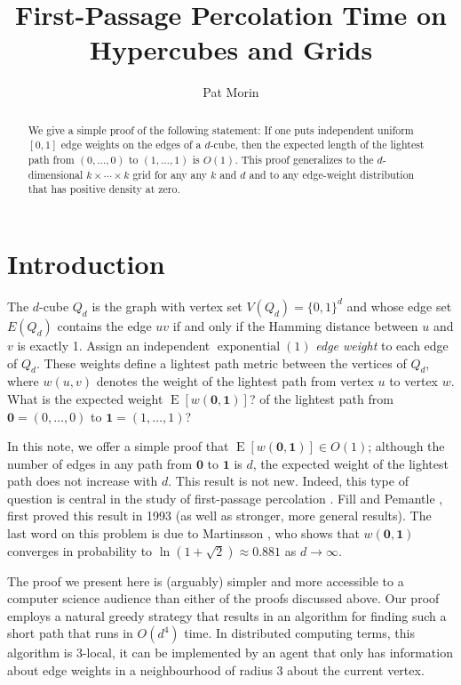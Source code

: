 \documentclass[a4paper,UKenglish]{lipics-v2016}
\title{First-Passage Percolation Time \newline on Hypercubes and Grids}
\author[1]{Pat Morin}
\affil[1]{Carleton University School of Computer Science, Ottawa, Canada \\
   \texttt{morin@scs.carleton.ca}a}
\DeclareMathOperator{\E}{E}
\DeclareMathOperator{\exponential}{exponential}
\begin{document}
\maketitle

\begin{abstract}
We give a simple proof of the following statement: If one puts independent
uniform $[0,1]$ edge weights on the edges of a $d$-cube, then the expected
length of the lightest path from $(0,\ldots,0)$ to $(1,\ldots,1)$ is
$O(1)$. This proof generalizes to the $d$-dimensional $k\times\cdots\times
k$ grid for any any $k$ and $d$ and to any edge-weight distribution that
has positive density at zero.
\end{abstract}

\section{Introduction}

The $d$-cube $Q_d$ is the graph with vertex set $V(Q_d)=\{0,1\}^d$
and whose edge set $E(Q_d)$ contains the edge $uv$ if and only if the
Hamming distance between $u$ and $v$ is exactly 1.
Assign an independent $\exponential(1)$ \emph{edge weight} to each
edge of $Q_d$.  These weights define a lightest path metric between the
vertices of $Q_d$, where $w(u,v)$ denotes the weight of the lightest
path from vertex $u$ to vertex $w$.  What is the expected weight
$\E[w(\mathbf{0},\mathbf{1})]$? of the lightest path from
$\mathbf{0}=(0,\ldots,0)$ to $\mathbf{1}=(1,\ldots,1)$?

In this note, we offer a simple proof that $\E[w(\mathbf{0},\mathbf{1})]
\in O(1)$;  although the number of edges in any path from $\mathbf{0}$
to $\mathbf{1}$ is $d$, the expected weight of the lightest path does not
increase with $d$.  This result is not new.  Indeed, this type of question
is central in the study of first-passage percolation \cite{X}. Fill and
Pemantle \cite{fill.pemantle:percolation}, first proved this result in
1993 (as well as stronger, more general results).  The last word on this
problem is due to Martinsson \cite{martinsson:unoriented}, who shows 
that $w(\mathbf{0},\mathbf{1})$
converges in probability to $\ln(1+\sqrt{2})\approx 0.881$ as
$d\rightarrow\infty$.  

The proof we present here is (arguably) simpler and more accessible to
a computer science audience than either of the proofs discussed above.
Our proof employs a natural greedy strategy that results in an algorithm for
finding such a short path that runs in $O(d^4)$ time.  In distributed
computing terms, this algorithm is 3-local, it can be implemented by an
agent that only has information about edge weights in a neighbourhood
of radius 3 about the current vertex.
\end{document}
